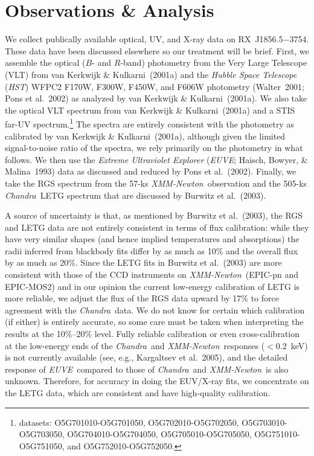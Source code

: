 \documentclass[useAMS,usegraphicx]{mn2e}
\newcommand{\etal}{et al.}
\newcommand{\rxjw}{RX~J1856.5$-$3754}
\newcommand{\xmm}{\textit{XMM-Newton}}
\newcommand{\chandra}{\textit{Chandra}}
\newcommand{\hst}{\textit{HST}}
\newcommand{\euve}{\textit{EUVE}}
\begin{document}
\section{Observations \& Analysis}
\label{sec:obs}

We collect publically available optical, UV, and X-ray data on
\rxjw.  These data have been discussed elsewhere so our treatment will
be brief.  First, we assemble the optical ($B$- and $R$-band)
photometry from the Very Large Telescope (VLT) from van Kerkwijk \&
Kulkarni~(2001a) and the \textit{Hubble Space Telescope} (\hst) WFPC2
F170W, F300W, F450W, and F606W photometry (Walter~2001; Pons
\etal~2002) as analyzed by van Kerkwijk \& Kulkarni~(2001a).  We also
take the optical VLT spectrum from van Kerkwijk \& Kulkarni~(2001a) and
a STIS far-UV spectrum.\footnote{datasets: O5G701010-O5G701050,
O5G702010-O5G702050, O5G703010-O5G703050, O5G704010-O5G704050,
O5G705010-O5G705050, O5G751010-O5G751050, and O5G752010-O5G752050.}
The spectra are entirely consistent with the photometry as calibrated
by van Kerkwijk \& Kulkarni~(2001a), although given the limited
signal-to-noise ratio of the spectra, we rely primarily on the
photometry in what follows.  We then use the \textit{Extreme
Ultraviolet Explorer} (\euve; Haisch, Bowyer, \& Malina~1993) data as
discussed and reduced by Pons \etal~(2002).  Finally, we take the RGS
spectrum from the 57-ks \xmm\ observation and the 505-ks \chandra\
LETG spectrum that are discussed by Burwitz \etal~(2003).

A source of uncertainty is that, as mentioned by Burwitz
\etal~(2003), the RGS and LETG data are not entirely consistent in
terms of flux calibration: while they have very similar shapes (and
hence implied temperatures and absorptions) the radii inferred from
blackbody fits differ by as much as 10\% and the overall flux by as
much as 20\%.
Since the LETG fits in Burwitz \etal~(2003) are more
consistent with those of the CCD instruments on \xmm\ (EPIC-pn and
EPIC-MOS2) and in our opinion the current low-energy calibration of
LETG is more reliable, we adjust the flux of the RGS data upward by
17\% to force agreement with the \chandra\ data.  We do not know for
certain which calibration (if either) is entirely accurate, so some
care must be taken when interpreting the results at the 10\%--20\%
level.  Fully reliable calibration or even cross-calibration at the
low-energy ends of the \chandra\ and \xmm\ responses
($<0.2$~keV) is not currently available (see, e.g., Kargaltsev
\etal~2005), and the detailed response of \euve\ compared to those
of \chandra\ and \xmm\ is also unknown.
Therefore, for accuracy in doing the EUV/X-ray fits, we concentrate
on the LETG data, which are consistent and have high-quality
calibration.
\end{document}
